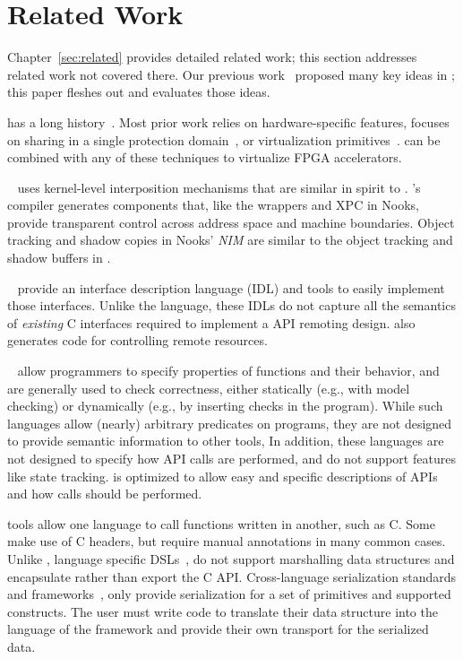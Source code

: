 \section{Related Work}
\label{s:related}

Chapter~\ref{sec:related} provides detailed related work; this section
addresses related work not covered there. Our previous work~\cite{hotos-ava}
proposed many key ideas in \model; this paper fleshes out and evaluates those
ideas.

has a long history~\cite{codezero,plessl2005zippy,
score,tartan06asplos,virtualRC,huang09fpgavirt,brant2012zuma,rcmw,
intermediate-fabrics}. Most prior work relies on hardware-specific features,
focuses on sharing in a single protection domain~\cite{amorphos}, or
virtualization primitives~\cite{cascade}. \model can be combined with any of
these techniques to virtualize FPGA accelerators.

~\cite{nooks} uses kernel-level interposition
mechanisms that are similar in spirit to \Model. \Model's compiler generates
components that, like the wrappers and XPC in Nooks, provide transparent
control across address space and machine boundaries. Object tracking and
shadow copies in Nooks' \emph{NIM} are similar to the object tracking and
shadow buffers in \model.

~\cite{grpc,thrift,corba,Yang1996} provide an
interface description language (IDL) and tools to easily implement those
interfaces. Unlike the \compiler language, these IDLs do not capture all the
semantics of \emph{existing} C interfaces required to implement a \novtechabbrv
API remoting design. \Compiler also generates code for controlling remote
resources.

~\cite{mssal} allow programmers
to specify properties of functions and their behavior, and are generally used
to check correctness, either statically (e.g., with model checking) or
dynamically (e.g., by inserting checks in the program). While such languages
allow (nearly) arbitrary predicates on programs, they are not designed to
provide semantic information to other tools, In addition, these languages are
not designed to specify how API calls are performed, and do not support
features like state tracking. \Speclang is optimized to allow easy and
specific descriptions of APIs and how calls should be performed.

 tools allow one language to call
functions written in another, such as C.
Some~\cite{swig} make use of C headers, but require manual annotations in many
common cases. Unlike \model, language specific DSLs~\cite{cython,jna},
do not support marshalling data structures and encapsulate rather than export
the C API.
Cross-language serialization standards and frameworks~\cite{protobuf, msgpack,
ecma404}, only provide serialization for a set of primitives and supported
constructs. The user must write code to translate their data structure into
the language of the framework and provide their own transport for the
serialized data.